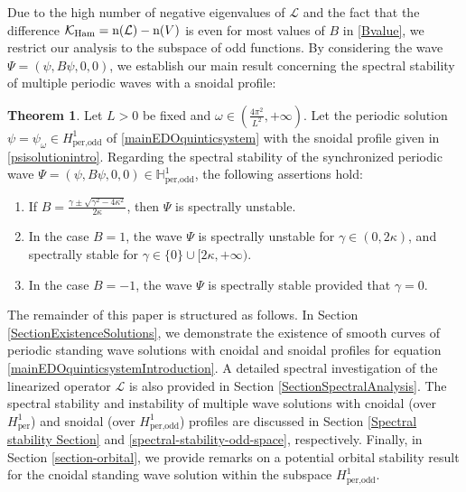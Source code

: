 \documentclass[10pt,reqno,a4paper]{amsart} %
\theoremstyle{definition} %
\numberwithin{equation}{section}
\numberwithin{figure}{section}
\newtheorem{theorem}{Theorem}[section]
\begin{document}
Due to the high number of negative eigenvalues of $\mathcal{L}$ and the fact that the difference $\mathcal{K_{\rm Ham}}={\rm n}(\mathcal{L}) - {\rm n}(V)$ is even for most values of $B$ in \eqref{Bvalue}, we restrict our analysis to the subspace of odd functions. By considering the wave $\Psi = (\psi, B\psi, 0,0)$, we establish our main result concerning the spectral stability of multiple periodic waves with a snoidal profile:

\begin{theorem}\label{teorema-snoidal}
    Let $L>0$ be fixed and $\omega \in \left( \frac{4\pi^2}{L^2}, +\infty \right)$. Let the periodic solution $\psi=\psi_\omega \in H^1_{\text{per,odd}}$ of \eqref{mainEDOquinticsystem} with the snoidal profile given in \eqref{psisolutionintro}. Regarding the spectral stability of the synchronized periodic wave $\Psi = (\psi, B \psi, 0, 0) \in \mathbb{H}^1_{\text{per,odd}}$, the following assertions hold:
    \begin{enumerate}
        \item[(i)] If $B = \frac{\gamma \pm \sqrt{\gamma^2 - 4\kappa^2}}{2\kappa}$, then $\Psi$ is spectrally unstable.
        \item[(ii)] In the case $B = 1$, the wave $\Psi$ is spectrally unstable for $\gamma \in (0,2\kappa)$, and spectrally stable for $\gamma \in \{0\} \cup [2\kappa, +\infty)$.
        \item[(iii)] In the case $B = -1$, the wave $\Psi$ is spectrally stable provided that $\gamma = 0$.
    \end{enumerate}
\end{theorem}

The remainder of this paper is structured as follows. In Section \ref{SectionExistenceSolutions}, we demonstrate the existence of smooth curves of periodic standing wave solutions with cnoidal and snoidal profiles for equation \eqref{mainEDOquinticsystemIntroduction}. A detailed spectral investigation of the linearized operator $\mathcal{L}$ is also provided in Section \ref{SectionSpectralAnalysis}. The spectral stability and instability of multiple wave solutions with cnoidal (over $H^1_{\text{per}}$) and snoidal (over $H^1_{\text{per,odd}}$) profiles are discussed in Section \ref{Spectral stability Section} and \ref{spectral-stability-odd-space}, respectively. Finally, in Section \ref{section-orbital}, we provide remarks on a potential orbital stability result for the cnoidal standing wave solution within the subspace $H^1_{\text{per,odd}}$.
\end{document}
